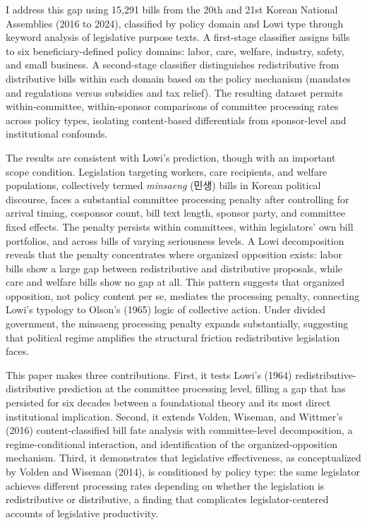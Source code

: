 \documentclass[11pt]{article}
\begin{document}
I address this gap using 15,291 bills from the 20th and 21st Korean National Assemblies (2016 to 2024), classified by policy domain and Lowi type through keyword analysis of legislative purpose texts. A first-stage classifier assigns bills to six beneficiary-defined policy domains: labor, care, welfare, industry, safety, and small business. A second-stage classifier distinguishes redistributive from distributive bills within each domain based on the policy mechanism (mandates and regulations versus subsidies and tax relief). The resulting dataset permits within-committee, within-sponsor comparisons of committee processing rates across policy types, isolating content-based differentials from sponsor-level and institutional confounds.

The results are consistent with Lowi's prediction, though with an important scope condition. Legislation targeting workers, care recipients, and welfare populations, collectively termed \textit{minsaeng} (민생) bills in Korean political discourse, faces a substantial committee processing penalty after controlling for arrival timing, cosponsor count, bill text length, sponsor party, and committee fixed effects. The penalty persists within committees, within legislators' own bill portfolios, and across bills of varying seriousness levels. A Lowi decomposition reveals that the penalty concentrates where organized opposition exists: labor bills show a large gap between redistributive and distributive proposals, while care and welfare bills show no gap at all. This pattern suggests that organized opposition, not policy content per se, mediates the processing penalty, connecting Lowi's typology to Olson's (1965) logic of collective action. Under divided government, the minsaeng processing penalty expands substantially, suggesting that political regime amplifies the structural friction redistributive legislation faces.

This paper makes three contributions. First, it tests Lowi's (1964) redistributive-distributive prediction at the committee processing level, filling a gap that has persisted for six decades between a foundational theory and its most direct institutional implication. Second, it extends Volden, Wiseman, and Wittmer's (2016) content-classified bill fate analysis with committee-level decomposition, a regime-conditional interaction, and identification of the organized-opposition mechanism. Third, it demonstrates that legislative effectiveness, as conceptualized by Volden and Wiseman (2014), is conditioned by policy type: the same legislator achieves different processing rates depending on whether the legislation is redistributive or distributive, a finding that complicates legislator-centered accounts of legislative productivity.
\end{document}
